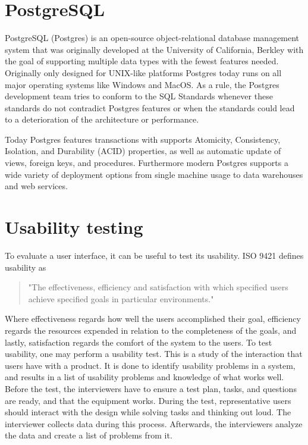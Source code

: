 \section*{PostgreSQL}
PostgreSQL (Postgres) is an open-source object-relational database management system that was originally developed at the University of California, Berkley with the goal of supporting multiple data types with the fewest features needed. Originally only designed for UNIX-like platforms Postgres today runs on all major operating systems like Windows and MacOS\cite{Postgres_Docs}.
As a rule, the Postgres development team tries to conform to the SQL Standards whenever these standards do not contradict Postgres features or when the standards could lead to a deterioration of the architecture or performance\cite{Postgres_Docs}. 

Today Postgres features transactions with supports Atomicity, Consistency, Isolation, and Durability (ACID) properties, as well as automatic update of views, foreign keys, and procedures. 
Furthermore modern Postgres supports a wide variety of deployment options from single machine usage to data warehouses and web services\cite{Postgres_Docs}.

\section*{Usability testing}
To evaluate a user interface, it can be useful to test its usability. ISO 9421 defines usability as
\begin{quote}
	"The effectiveness, efficiency and satisfaction with which specified users achieve specified goals in particular environments."
\end{quote}

Where effectiveness regards how well the users accomplished their goal, efficiency regards the resources expended in relation to the completeness of the goals, and lastly, satisfaction regards the comfort of the system to the users.
To test usability, one may perform a usability test. This is a study of the interaction that users have with a product. It is done to identify usability problems in a system, and results in a list of usability problems and knowledge of what works well.
Before the test, the interviewers have to ensure a test plan, tasks, and questions are ready, and that the equipment works.
During the test, representative users should interact with the design while solving tasks and thinking out loud. The interviewer collects data during this process.
Afterwards, the interviewers analyze the data and create a list of problems from it.
\cite{deb7}
